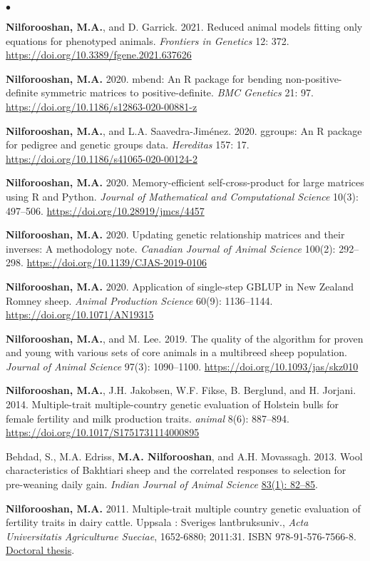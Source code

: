 \documentclass[margin,line]{res}
\newenvironment{list2}{
  \begin{list}{$\bullet$}{%
      \setlength{\itemsep}{0in}
      \setlength{\parsep}{0in} \setlength{\parskip}{0in}
      \setlength{\topsep}{0in} \setlength{\partopsep}{0in}
      \setlength{\leftmargin}{0.2in}}}{\end{list}}
\begin{document}
\begin{resume}
\begin{list2}
    \item {\bf Nilforooshan, M.A.}, and D. Garrick. 2021. Reduced animal models fitting only equations for phenotyped animals. {\em Frontiers in Genetics} 12: 372. \url{https://doi.org/10.3389/fgene.2021.637626}
    \item {\bf Nilforooshan, M.A.} 2020. mbend: An R package for bending non-positive-deﬁnite symmetric matrices to positive-deﬁnite. {\em BMC Genetics} 21: 97. \url{https://doi.org/10.1186/s12863-020-00881-z}
    \item {\bf Nilforooshan, M.A.}, and L.A. Saavedra-Jim\'{e}nez. 2020. ggroups: An R package for pedigree and genetic groups data. {\em Hereditas} 157: 17. \url{https://doi.org/10.1186/s41065-020-00124-2}
    \item {\bf Nilforooshan, M.A.} 2020. Memory-efficient self-cross-product for large matrices using R and Python. {\em Journal of Mathematical and Computational Science} 10(3): 497--506. \url{https://doi.org/10.28919/jmcs/4457}
    \item {\bf Nilforooshan, M.A.} 2020. Updating genetic relationship matrices and their inverses: A methodology note. {\em Canadian Journal of Animal Science} 100(2): 292--298. \url{https://doi.org/10.1139/CJAS-2019-0106}
    \item {\bf Nilforooshan, M.A.} 2020. Application of single-step GBLUP in New Zealand Romney sheep. {\em Animal Production Science} 60(9): 1136--1144. \url{https://doi.org/10.1071/AN19315}
    \item {\bf Nilforooshan, M.A.}, and M. Lee. 2019. The quality of the algorithm for proven and young with various sets of core animals in a multibreed sheep population. {\em Journal of Animal Science} 97(3): 1090--1100. \url{https://doi.org/10.1093/jas/skz010}
    \item {\bf Nilforooshan, M.A.}, J.H. Jakobsen, W.F. Fikse, B. Berglund, and H. Jorjani. 2014. Multiple-trait multiple-country genetic evaluation of Holstein bulls for female fertility and milk production traits. {\em animal} 8(6): 887--894. \url{https://doi.org/10.1017/S1751731114000895}
    \item Behdad, S., M.A. Edriss, {\bf M.A. Nilforooshan}, and A.H. Movassagh. 2013. Wool characteristics of Bakhtiari sheep and the correlated responses to selection for pre-weaning daily gain. {\em Indian Journal of Animal Science} \href{http://epubs.icar.org.in/ejournal/index.php/IJAnS/article/view/26453}{83(1): 82--85}.
    \item {\bf Nilforooshan, M.A.} 2011. Multiple-trait multiple country genetic evaluation of fertility traits in dairy cattle. Uppsala : Sveriges lantbruksuniv., {\em Acta Universitatis Agriculturae Sueciae}, 1652-6880; 2011:31. ISBN 978-91-576-7566-8. \href{https://res.slu.se/id/publ/33755}{Doctoral thesis}.

\end{list2}
\end{resume}
\end{document}
